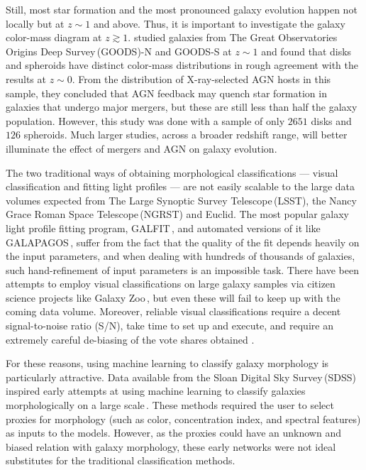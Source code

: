 Still, most star formation and the most pronounced galaxy evolution happen not locally but at $z\sim1$ and above. Thus, it is important to investigate the galaxy color-mass diagram at $z\gtrsim1$. \citet{powell_17} studied galaxies from The Great Observatories Origins Deep Survey\,(GOODS)-N and GOODS-S at $z\sim1$ and found that disks and spheroids have distinct color-mass distributions in rough agreement with the results at $z\sim0$. From the distribution of X-ray-selected AGN hosts in this sample, they concluded that AGN feedback may quench star formation in galaxies that undergo major mergers, but these are still less than half the galaxy population. However, this study was done with a sample of only $2651$ disks and $126$ spheroids. Much larger studies, across a broader redshift range, will better illuminate the effect of mergers and AGN on galaxy evolution. 

The two traditional ways of obtaining morphological classifications --- visual classification and fitting light profiles --- are not easily scalable to the large data volumes expected from The Large Synoptic Survey Telescope\,(LSST), the Nancy Grace Roman Space Telescope\,(NGRST) and Euclid. The most popular galaxy light profile fitting program, GALFIT\,\citep{galfit}, and automated versions of it like GALAPAGOS\,\citep{galapagos}, suffer from the fact that the quality of the fit depends heavily on the input parameters, and when dealing with hundreds of thousands of galaxies, such hand-refinement of input parameters is an impossible task. There have been attempts to employ visual classifications on large galaxy samples via citizen science projects like Galaxy Zoo\,\citep{gzoo_original,gzoo_p2}, but even these will fail to keep up with the coming data volume. Moreover, reliable visual classifications require a decent signal-to-noise ratio (S/N), take time to set up and execute, and require an extremely careful de-biasing of the vote shares obtained \citep{gzoo_original,gzoo_candels}. 

For these reasons, using machine learning to classify galaxy morphology is particularly attractive. Data available from the Sloan Digital Sky Survey\,(SDSS) inspired early attempts at using machine learning to classify galaxies morphologically on a large scale\,\citep[e.g.,][]{Ball2004GalaxyNetworks,Kelly2004MorphologicalSurvey,banerji_10}. These methods required the user to select proxies for morphology (such as color, concentration index, and spectral features) as inputs to the models. However, as the proxies could have an unknown and biased relation with galaxy morphology, these early networks were not ideal substitutes for the traditional classification methods. 

